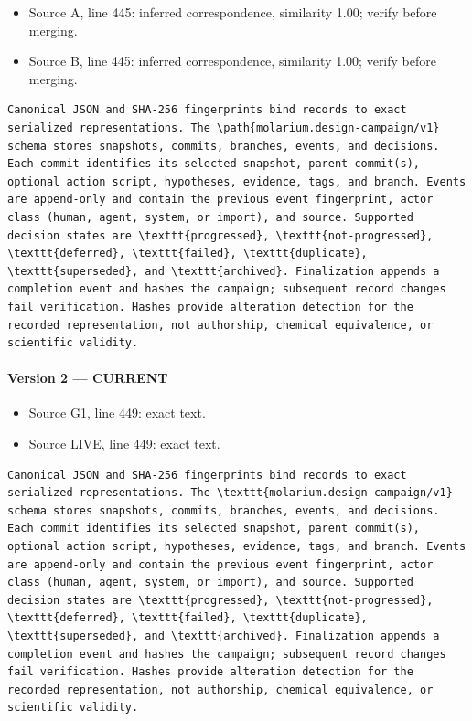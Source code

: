 \documentclass[11pt]{article}
\begin{document}
\begin{itemize}[leftmargin=*]
\item Source A, line 445: inferred correspondence, similarity 1.00; verify before merging.
\item Source B, line 445: inferred correspondence, similarity 1.00; verify before merging.
\end{itemize}

\begin{lstlisting}
Canonical JSON and SHA-256 fingerprints bind records to exact serialized representations. The \path{molarium.design-campaign/v1} schema stores snapshots, commits, branches, events, and decisions. Each commit identifies its selected snapshot, parent commit(s), optional action script, hypotheses, evidence, tags, and branch. Events are append-only and contain the previous event fingerprint, actor class (human, agent, system, or import), and source. Supported decision states are \texttt{progressed}, \texttt{not-progressed}, \texttt{deferred}, \texttt{failed}, \texttt{duplicate}, \texttt{superseded}, and \texttt{archived}. Finalization appends a completion event and hashes the campaign; subsequent record changes fail verification. Hashes provide alteration detection for the recorded representation, not authorship, chemical equivalence, or scientific validity.
\end{lstlisting}

\paragraph{Version 2 --- CURRENT}

\begin{itemize}[leftmargin=*]
\item Source G1, line 449: exact text.
\item Source LIVE, line 449: exact text.
\end{itemize}

\begin{lstlisting}
Canonical JSON and SHA-256 fingerprints bind records to exact serialized representations. The \texttt{molarium.design-campaign/v1} schema stores snapshots, commits, branches, events, and decisions. Each commit identifies its selected snapshot, parent commit(s), optional action script, hypotheses, evidence, tags, and branch. Events are append-only and contain the previous event fingerprint, actor class (human, agent, system, or import), and source. Supported decision states are \texttt{progressed}, \texttt{not-progressed}, \texttt{deferred}, \texttt{failed}, \texttt{duplicate}, \texttt{superseded}, and \texttt{archived}. Finalization appends a completion event and hashes the campaign; subsequent record changes fail verification. Hashes provide alteration detection for the recorded representation, not authorship, chemical equivalence, or scientific validity.
\end{lstlisting}
\end{document}
